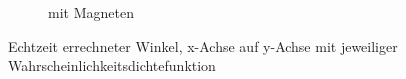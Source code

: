 \begin{landscape}
\begin{figure}[tb]
\begin{subfigure}[c]{.45\linewidth}
				\caption{mit Magneten}
			\end{subfigure}
		\caption{Echtzeit errechneter Winkel, x-Achse auf y-Achse mit jeweiliger Wahrscheinlichkeitsdichtefunktion} \label{Angle}
	\end{figure}
\end{landscape}